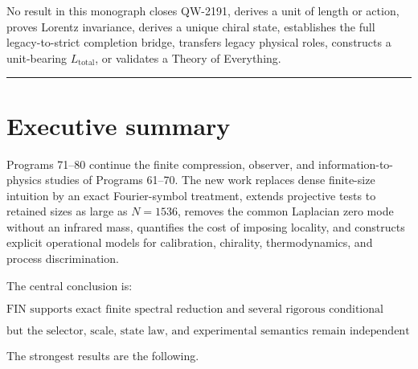 \documentclass[11pt,a4paper,openany]{report}
\begin{document}
No result in this monograph closes QW-2191, derives a unit of length or action, proves Lorentz invariance, derives a unique chiral state, establishes the full legacy-to-strict completion bridge, transfers legacy physical roles, constructs a unit-bearing \(L_{\mathrm{total}}\), or validates a Theory of Everything.

\par\medskip\hrule\medskip

\chapter{Executive summary}

Programs 71--80 continue the finite compression, observer, and information-to-physics studies of Programs 61--70. The new work replaces dense finite-size intuition by an exact Fourier-symbol treatment, extends projective tests to retained sizes as large as \(N=1536\), removes the common Laplacian zero mode without an infrared mass, quantifies the cost of imposing locality, and constructs explicit operational models for calibration, chirality, thermodynamics, and process discrimination.

The central conclusion is:

\[
\boxed{
\text{FIN supports exact finite spectral reduction and several rigorous conditional interfaces,}
}
\]

\[
\boxed{
\text{but the selector, scale, state law, and experimental semantics remain independent inputs.}
}
\]

The strongest results are the following.
\end{document}
